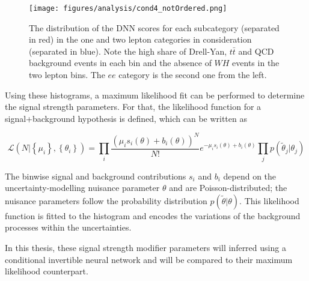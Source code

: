 \begin{figure}[h]
	\centering
	\texttt{[image: figures/analysis/cond4\_notOrdered.png]}
	\caption{The distribution of the DNN scores for each subcategory (separated in red) in the one and two lepton categories in consideration (separated in blue). Note the high share of Drell-Yan, $t\bar{t}$ and QCD background events in each bin and the absence of $WH$ events in the two lepton bins. The $ee$ category is the second one from the left.}
	\label{fig:conditions}
\end{figure}


Using these histograms, a maximum likelihood fit can be performed to determine the signal strength parameters. For that, the likelihood function for a signal+background hypothesis is defined, which can be written as

\begin{equation*}
	\mathcal{L}(N | \left\{\mu_i\right\} , \left\{\theta_i\right\}) = \prod\limits_i \frac{(\mu_is_i(\theta)+b_i(\theta))^N}{N!}e^{-\mu_is_i(\theta) + b_i(\theta)} \prod\limits_j p(\tilde{\theta}_j | \theta_j)
\end{equation*}

The binwise signal and background contributions $s_i$ and $b_i$ depend on the uncertainty-modelling nuisance parameter $\theta$ and are Poisson-distributed; the nuisance parameters follow the probability distribution $p(\tilde{\theta} | \theta)$. This likelihood function is fitted to the histogram and encodes the variations of the background processes within the uncertainties.

In this thesis, these signal strength modifier parameters will inferred using a conditional invertible neural network and will be compared to their maximum likelihood counterpart.